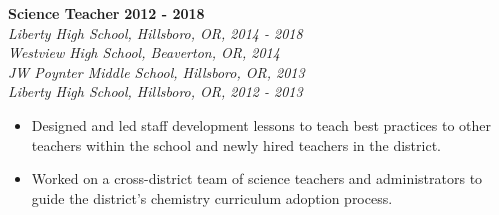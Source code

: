 \documentclass[11pt]{article}
\begin{document}
\medbreak \noindent
%
\textbf{Science Teacher} \hfill \textbf{2012 - 2018}\\
\textit{Liberty High School, Hillsboro, OR, 2014 - 2018}\\
\textit{Westview High School, Beaverton, OR, 2014}\\
\textit{JW Poynter Middle School, Hillsboro, OR, 2013}\\
\textit{Liberty High School, Hillsboro, OR, 2012 - 2013}
\begin{itemize}[leftmargin=*, itemsep=0pt, topsep=5pt]
	\item Designed and led staff development lessons to teach best practices to other teachers within the school and newly hired teachers in the district.
	\item Worked on a cross-district team of science teachers and administrators to guide the district’s chemistry curriculum adoption process.
\end{itemize}
\medbreak \noindent
%
%
\end{document}
